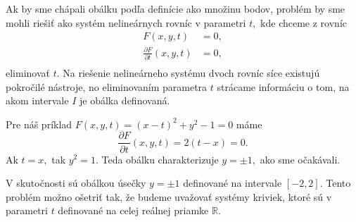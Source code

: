 Ak by sme chápali obálku podľa definície ako množinu bodov, problém by sme mohli riešiť ako systém nelineárnych rovníc v parametri $t,$ kde chceme z rovníc 
\begin{align*}
F(x,y,t) &= 0, \\
\frac{\partial F}{\partial t}(x, y, t) &= 0, \\
\end{align*}
eliminovať $t.$ Na riešenie nelineárneho systému dvoch rovníc síce existujú pokročilé nástroje, no eliminovaním parametra $t$ strácame informáciu o tom, na akom intervale $I$ je obálka definovaná.
\begin{example}
Pre náš príklad $ F(x, y, t) = (x - t)^2 + y^2 - 1 = 0 $ máme 
$$\frac{\partial F}{\partial t}(x, y, t) = 2(t-x) = 0. $$
Ak $t = x, $ tak $y^2 = 1.$ Teda obálku charakterizuje $ y = \pm 1, $ ako sme očakávali.
\end{example}
V skutočnosti sú obálkou úsečky $y=\pm 1$ definované na intervale $[-2,2]$. Tento problém možno ošetriť tak, že budeme uvažovať systémy kriviek, ktoré sú v parametri $t$ definované na celej reálnej priamke $\mathbb{R}$. 

